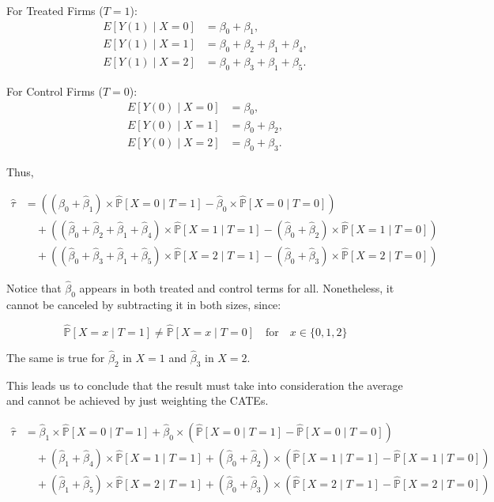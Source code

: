 \documentclass{article}
\begin{document}
For Treated Firms (\(T = 1\)):
\[
\begin{aligned}
    E[Y(1) \mid X = 0] &= \beta_0 + \beta_1, \\
    E[Y(1) \mid X = 1] &= \beta_0 + \beta_2 + \beta_1 + \beta_4, \\
    E[Y(1) \mid X = 2] &= \beta_0 + \beta_3 + \beta_1 + \beta_5.
\end{aligned}
\]

For Control Firms (\(T = 0\)):
\[
\begin{aligned}
E[Y(0) \mid X = 0] &= \beta_0, \\
E[Y(0) \mid X = 1] &= \beta_0 + \beta_2, \\
E[Y(0) \mid X = 2] &= \beta_0 + \beta_3.
\end{aligned}
\]

Thus,

\[
\begin{aligned}
\hat{\tau} &= \left( (\hat{\beta}_0 + \hat{\beta}_1) \times \hat{\mathbb{P}}[X = 0 \mid T = 1] - \hat{\beta}_0 \times \hat{\mathbb{P}}[X = 0 \mid T = 0] \right) \\
&\quad + \left( (\hat{\beta}_0 + \hat{\beta}_2 + \hat{\beta}_1 + \hat{\beta}_4) \times \hat{\mathbb{P}}[X = 1 \mid T = 1] - (\hat{\beta}_0 + \hat{\beta}_2) \times \hat{\mathbb{P}}[X = 1 \mid T = 0] \right) \\
&\quad + \left( (\hat{\beta}_0 + \hat{\beta}_3 + \hat{\beta}_1 + \hat{\beta}_5) \times \hat{\mathbb{P}}[X = 2 \mid T = 1] - (\hat{\beta}_0 + \hat{\beta}_3) \times \hat{\mathbb{P}}[X = 2 \mid T = 0] \right)
\end{aligned}
\]

Notice that \(\hat{\beta}_0\) appears in both treated and control terms for all. Nonetheless, it cannot be canceled by subtracting it in both sizes, since:

$$
\hat{\mathbb{P}}[X = x \mid T = 1] \neq \hat{\mathbb{P}}[X = x \mid T = 0] \quad \text{for} \quad x \in \{ 0, 1, 2 \}
$$

The same is true for $\hat{\beta}_2$ in $X = 1$ and $\hat{\beta}_3$ in $X = 2$.

This leads us to conclude that the result must take into consideration the average and cannot be achieved by just weighting the CATEs.

\[
\begin{aligned}
\hat{\tau} &= \hat{\beta}_1 \times \hat{\mathbb{P}}[X = 0 \mid T = 1] + \hat{\beta}_0 \times \left(\hat{\mathbb{P}}[X = 0 \mid T = 1] - \hat{\mathbb{P}}[X = 0 \mid T = 0]\right) \\
&\quad + (\hat{\beta}_1 + \hat{\beta}_4) \times \hat{\mathbb{P}}[X = 1 \mid T = 1] + (\hat{\beta}_0 + \hat{\beta}_2) \times \left(\hat{\mathbb{P}}[X = 1 \mid T = 1] - \hat{\mathbb{P}}[X = 1 \mid T = 0]\right) \\
&\quad + (\hat{\beta}_1 + \hat{\beta}_5) \times \hat{\mathbb{P}}[X = 2 \mid T = 1] + (\hat{\beta}_0 + \hat{\beta}_3) \times \left(\hat{\mathbb{P}}[X = 2 \mid T = 1] - \hat{\mathbb{P}}[X = 2 \mid T = 0]\right)
\end{aligned}
\]
\end{document}
